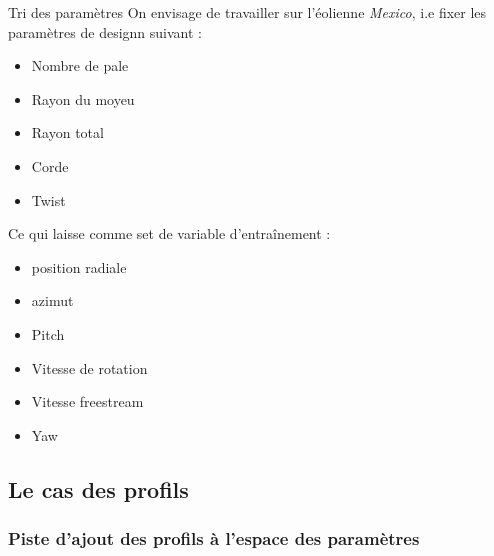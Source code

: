 \documentclass[
11pt,notheorems,hyperref={pdfauthor=whatever}
]{beamer}
\begin{document}
\begin{frame}{Tri des paramètres}
On envisage de travailler sur l'éolienne \textit{Mexico}, i.e fixer les paramètres de designn suivant : 
\begin{itemize}
    \item Nombre de pale
    \item Rayon du moyeu
    \item Rayon total 
    \item Corde
    \item Twist
\end{itemize}

\vspace{0.3cm}

Ce qui laisse comme set de variable d'entraînement : 
\begin{itemize}
    \item position radiale
    \item azimut
    \item Pitch
    \item Vitesse de rotation
    \item Vitesse freestream
    \item Yaw
\end{itemize}
\end{frame}
\subsection{Le cas des profils}

\subsubsection{Piste d'ajout des profils à l'espace des paramètres}
\end{document}
